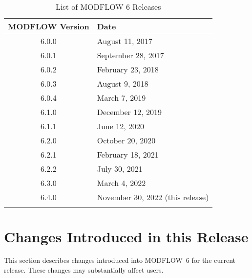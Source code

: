 \documentclass[11pt,twoside,twocolumn]{usgsreport}
\begin{document}
\begin{table}[h]
\begin{center}
\caption{List of MODFLOW 6 Releases}
\small 
\begin{tabular*}{12cm}{cl}
\hline
\hline
\textbf{MODFLOW Version} & \textbf{Date}\\
\hline
6.0.0 & August 11, 2017 \\
6.0.1 & September 28, 2017 \\
6.0.2 & February 23, 2018 \\
6.0.3 & August 9, 2018 \\
6.0.4 & March 7, 2019 \\
6.1.0 & December 12, 2019 \\
6.1.1 & June 12, 2020 \\
6.2.0 & October 20, 2020 \\
6.2.1 & February 18, 2021 \\
6.2.2 & July 30, 2021 \\
6.3.0 & March 4, 2022 \\
6.4.0 & November 30, 2022 (this release) \\
\hline
\label{tab:releases}
\end{tabular*}
\end{center}
\normalsize
\end{table}


\section{Changes Introduced in this Release}
This section describes changes introduced into MODFLOW~6 for the current release.  These changes may substantially affect users.
\end{document}
